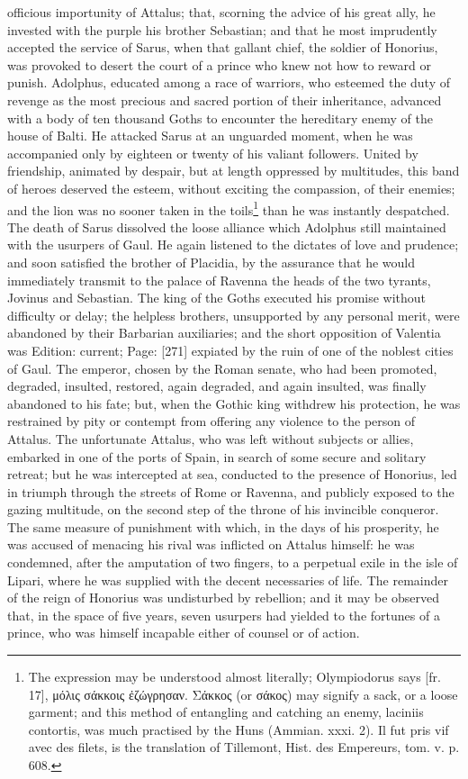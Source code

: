 officious importunity of Attalus; that, scorning the advice of his great ally, he invested with the purple his brother Sebastian; and that he most imprudently accepted the service of Sarus, when that gallant chief, the soldier of Honorius, was provoked to desert the court of a prince who knew not how to reward or punish. Adolphus, educated among a race of warriors, who esteemed the duty of revenge as the most precious and sacred portion of their inheritance, advanced with a body of ten thousand Goths to encounter the hereditary enemy of the house of Balti. He attacked Sarus at an unguarded moment, when he was accompanied only by eighteen or twenty of his valiant followers. United by friendship, animated by despair, but at length oppressed by multitudes, this band of heroes deserved the esteem, without exciting the compassion, of their enemies; and the lion was no sooner taken in the toils\footnote{The expression may be understood almost literally; Olympiodorus says [fr. 17], \textgreek{μόλις σάκκοις \texthebrew{ἐ}ζώγρησαν. Σάκκος} (or \textgreek{σάκος}) may signify a sack, or a loose garment; and this method of entangling and catching an enemy, laciniis contortis, was much practised by the Huns (Ammian. xxxi. 2). Il fut pris vif avec des filets, is the translation of Tillemont, Hist. des Empereurs, tom. v. p. 608.} than he was instantly despatched. The death of Sarus dissolved the loose alliance which Adolphus still maintained with the usurpers of Gaul. He again listened to the dictates of love and prudence; and soon satisfied the brother of Placidia, by the assurance that he would immediately transmit to the palace of Ravenna the heads of the two tyrants, Jovinus and Sebastian. The king of the Goths executed his promise without difficulty or delay; the helpless brothers, unsupported by any personal merit, were abandoned by their Barbarian auxiliaries; and the short opposition of Valentia was Edition: current; Page: [271] expiated by the ruin of one of the noblest cities of Gaul. The emperor, chosen by the Roman senate, who had been promoted, degraded, insulted, restored, again degraded, and again insulted, was finally abandoned to his fate; but, when the Gothic king withdrew his protection, he was restrained by pity or contempt from offering any violence to the person of Attalus. The unfortunate Attalus, who was left without subjects or allies, embarked in one of the ports of Spain, in search of some secure and solitary retreat; but he was intercepted at sea, conducted to the presence of Honorius, led in triumph through the streets of Rome or Ravenna, and publicly exposed to the gazing multitude, on the second step of the throne of his invincible conqueror. The same measure of punishment with which, in the days of his prosperity, he was accused of menacing his rival was inflicted on Attalus himself: he was condemned, after the amputation of two fingers, to a perpetual exile in the isle of Lipari, where he was supplied with the decent necessaries of life. The remainder of the reign of Honorius was undisturbed by rebellion; and it may be observed that, in the space of five years, seven usurpers had yielded to the fortunes of a prince, who was himself incapable either of counsel or of action.

